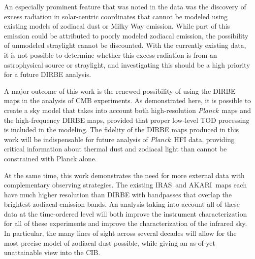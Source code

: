 \documentclass{aa}
\def\Planck{\textit{Planck}}
\def\AKARI{\textrm{{AKARI}}}
\def\IRAS{\textrm{{IRAS}}}
\begin{document}
An especially prominent feature that was noted in the data was the discovery of excess radiation in solar-centric coordinates that cannot be modeled using existing models of zodiacal dust or Milky Way emission. While part of this emission could be attributed to poorly modeled zodiacal emission, the possibility of unmodeled straylight cannot be discounted. With the currently existing data, it is not possible to determine whether this excess radiation is from an astrophysical source or straylight, and investigating this should be a high priority for a future DIRBE analysis.

A major outcome of this work is the renewed possibility of using the DIRBE maps in the analysis of CMB experiments. As demonstrated here, it is possible to create a sky model that takes into account both high-resolution \Planck\ maps and the high-frequency DIRBE maps, provided that proper low-level TOD processing is included in the modeling. The fidelity of the DIRBE maps produced in this work will be indispensable for future analysis of \Planck\ HFI data, providing critical information about thermal dust and zodiacal light than cannot be constrained with Planck alone.

At the same time, this work demonstrates the need for more external data with complementary observing strategies. The existing \IRAS\ and \AKARI\ maps each have much higher resolution than DIRBE with bandpasses that overlap the brightest zodiacal emission bands. An analysis taking into account all of these data at the time-ordered level will both improve the instrument characterization for all of these experiments and improve the characterization of the infrared sky. In particular, the many lines of sight across several decades will allow for the most precise model of zodiacal dust possible, while giving an as-of-yet unattainable view into the CIB.
\end{document}
